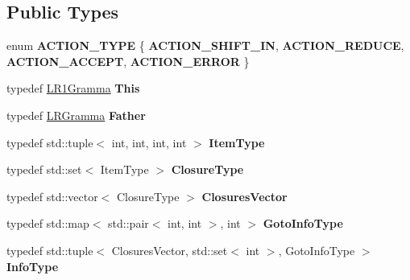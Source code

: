 \subsection*{Public Types}
\begin{DoxyCompactItemize}
\item 
\mbox{\label{classx2_1_1_l_r1_gramma_a8414ee258d00cf8d590cd983a0fe7465}} 
enum {\bfseries A\+C\+T\+I\+O\+N\+\_\+\+T\+Y\+PE} \{ {\bfseries A\+C\+T\+I\+O\+N\+\_\+\+S\+H\+I\+F\+T\+\_\+\+IN}, 
{\bfseries A\+C\+T\+I\+O\+N\+\_\+\+R\+E\+D\+U\+CE}, 
{\bfseries A\+C\+T\+I\+O\+N\+\_\+\+A\+C\+C\+E\+PT}, 
{\bfseries A\+C\+T\+I\+O\+N\+\_\+\+E\+R\+R\+OR}
 \}
\item 
\mbox{\label{classx2_1_1_l_r1_gramma_a030a0572b868d847a663fee42e00011b}} 
typedef \hyperlink{classx2_1_1_l_r1_gramma}{L\+R1\+Gramma} {\bfseries This}
\item 
\mbox{\label{classx2_1_1_l_r1_gramma_a218431439b832892e36f7eaae2beb4c2}} 
typedef \hyperlink{classx2_1_1_l_r_gramma}{L\+R\+Gramma} {\bfseries Father}
\item 
\mbox{\label{classx2_1_1_l_r1_gramma_af651f585181b1fceff704dba8dc5ebcc}} 
typedef std\+::tuple$<$ int, int, int, int $>$ {\bfseries Item\+Type}
\item 
\mbox{\label{classx2_1_1_l_r1_gramma_acf6e4450e836fec8cd5c87d110e26ea9}} 
typedef std\+::set$<$ Item\+Type $>$ {\bfseries Closure\+Type}
\item 
\mbox{\label{classx2_1_1_l_r1_gramma_a0bfe3e4cb0ef43da0823e520be4d461e}} 
typedef std\+::vector$<$ Closure\+Type $>$ {\bfseries Closures\+Vector}
\item 
\mbox{\label{classx2_1_1_l_r1_gramma_a96d8b7263ffce6eaf1ba10d3daa7afdc}} 
typedef std\+::map$<$ std\+::pair$<$ int, int $>$, int $>$ {\bfseries Goto\+Info\+Type}
\item 
\mbox{\label{classx2_1_1_l_r1_gramma_a77b658cf079a64b28967cfa7f977bd08}} 
typedef std\+::tuple$<$ Closures\+Vector, std\+::set$<$ int $>$, Goto\+Info\+Type $>$ {\bfseries Info\+Type}
\end{DoxyCompactItemize}
